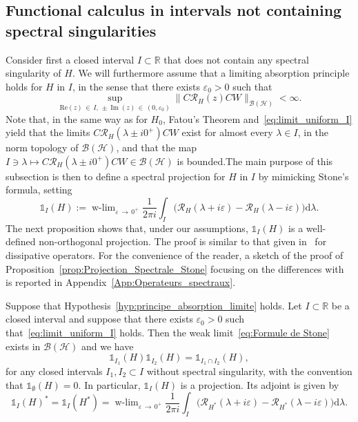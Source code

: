 \documentclass[10pt]{amsart}
\theoremstyle{definition}\newtheorem{defi}[theo]{Definition}\newtheorem{rema}[theo]{Remark}\newtheorem{exam}[theo]{Example}\newtheorem{exem}[theo]{Example}\newtheorem{nota}[theo]{Notation}
\newcommand{\Hi}{\mathcal{H}}
\newcommand{\R}{\mathbb{R}}
\newcommand{\rmd}{\mathrm{d}}
\newcommand{\Res}{\mathcal{R}}
\newcommand{\clB}{\mathcal{B}}
\DeclareMathOperator{\wlim}{w-lim}
\DeclareMathOperator{\im}{Im}
\begin{document}
\subsection{Functional calculus in intervals not containing spectral singularities}\label{subsec:spectr_proj}

Consider first a closed interval $I\subset\R$ that does not contain any spectral singularity of $H$. We will furthermore assume that a limiting absorption principle holds for $H$ in $I$, in the sense that there exists $\varepsilon_0>0$ such that
\begin{equation}\label{eq:limit_uniform_I}
\sup_{\mathrm{Re}(z)\,\in\,I,\,\pm\im(z)\,\in\,(0,\varepsilon_0)} \big\|C\Res_H(z)CW\big\|_{\clB(\Hi)}<\infty.
\end{equation}
Note that, in the same way as for $H_0$, Fatou's Theorem and~\eqref{eq:limit_uniform_I} yield that the limits $C\Res_H(\lambda\pm i0^+)CW$ exist for almost every $\lambda\in I$, in the norm topology of $\clB(\Hi)$, and that the map $I \ni\lambda\mapsto C\Res_H(\lambda\pm i0^+)CW\in\clB(\Hi)$ is bounded.The main purpose of this subsection is then to define a spectral projection for $H$ in $I$ by mimicking Stone's formula, setting
\begin{equation}\label{eq:Formule de Stone}
\mathds{1}_I(H):=\wlim_{\varepsilon\,\rightarrow\,0^+}\frac{1}{2\pi i}\int_I\big(\Res_H(\lambda+i\varepsilon)-\Res_H(\lambda-i\varepsilon)\big)\rmd \lambda.
\end{equation}
The next proposition shows that, under our assumptions, $\mathds{1}_I(H)$ is a well-defined non-orthogonal projection. The proof is similar to that given in~\cite{FaFr18_01} for dissipative operators. For the convenience of the reader, a sketch of the proof of Proposition~\ref{prop:Projection_Spectrale_Stone} focusing on the differences with~\cite{FaFr18_01} is reported in Appendix~\ref{App:Operateurs_spectraux}.

\begin{prop}\label{prop:Projection_Spectrale_Stone}
Suppose that Hypothesis~\ref{hyp:principe_absorption_limite} holds. Let $I\subset\R$ be a closed interval and suppose that there exists $\varepsilon_0>0$ such that~\eqref{eq:limit_uniform_I} holds. Then the weak limit~\eqref{eq:Formule de Stone} exists in $\clB(\Hi)$ and we have
\begin{equation}\label{eq:Projection_spectral_propriété_de_projection}
\mathds{1}_{I_1}(H) \mathds{1}_{I_2}(H)=\mathds{1}_{I_1\cap I_2}(H),
\end{equation}
for any closed intervals $I_1,I_2\subset I$ without spectral singularity, with the convention that $\mathds{1}_\emptyset(H)=0$. In particular, $\mathds{1}_I(H)$ is a projection. Its adjoint is given by
\begin{equation}\label{eq:Projection_spectral_propriété_d'adjonction}
\mathds{1}_I(H)^*=\mathds{1}_I(H^*)=\wlim_{\varepsilon\,\rightarrow\, 0^+}\frac{1}{2\pi i}\int_I\big(\Res_{H^*}(\lambda+i\varepsilon)-\Res_{H^*}(\lambda-i\varepsilon)\big)\rmd \lambda.
\end{equation}
\end{prop}
\end{document}
